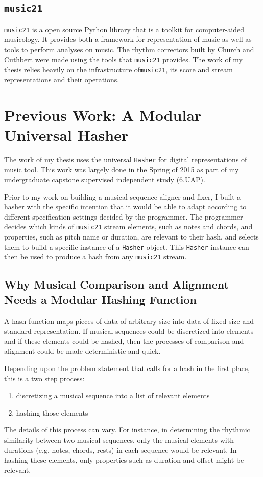 \subsection{\texttt{music21}}
\texttt{music21} is a open source Python library that is a toolkit for computer-aided musicology. It provides both a framework for representation of music as well as tools to perform analyses on music. The rhythm correctors built by Church and Cuthbert were made using the tools that \texttt{music21} provides. The work of my thesis relies heavily on the infrastructure of\texttt{music21}, its score and stream representations and their operations. 

\section{Previous Work: A Modular Universal Hasher} \label{hasher}
The work of my thesis uses the universal \texttt{Hasher} for digital representations of music tool. This work was largely done in the Spring of 2015 as part of my undergraduate capstone supervised independent study (6.UAP). 

Prior to my work on building a musical sequence aligner and fixer, I built a hasher with the specific intention that it would be able  to adapt according to different specification settings decided by the programmer. The programmer decides which kinds of \texttt{music21} stream elements, such as notes and chords, and properties, such as pitch name or duration, are relevant to their hash, and selects them to build a specific instance of a \texttt{Hasher} object. This \texttt{Hasher} instance can then be used to produce a hash from any \texttt{music21} stream. 

\subsection{Why Musical Comparison and Alignment Needs a Modular Hashing Function}
A hash function maps pieces of data of arbitrary size into data of fixed size and standard representation. If musical sequences could be discretized into elements and if these elements could be hashed, then the processes of comparison and alignment could be made deterministic and quick. 

Depending upon the problem statement that calls for a hash in the first place, this is a two step process:
\begin{enumerate}
\item discretizing a musical sequence into a list of relevant elements
\item hashing those elements  
\end{enumerate}
The details of this process can vary.  For instance, in determining the rhythmic similarity between two musical sequences, only the musical elements with durations (e.g. notes, chords, rests) in each sequence would be relevant. In hashing these elements, only properties such as duration and offset might be relevant. 

